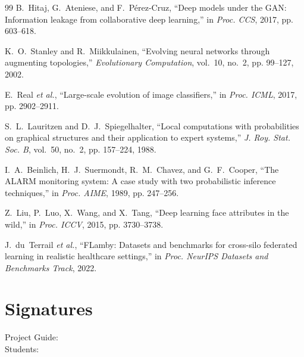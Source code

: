 \documentclass[journal]{IEEEtran}
\begin{document}
\begin{thebibliography}{99}
  B.~Hitaj, G.~Ateniese, and F.~P\'erez-Cruz,
  ``Deep models under the {GAN}: Information leakage from collaborative deep learning,''
  in \emph{Proc. CCS}, 2017, pp. 603--618.

  K.~O.~Stanley and R.~Miikkulainen,
  ``Evolving neural networks through augmenting topologies,''
  \emph{Evolutionary Computation}, vol.~10, no.~2, pp. 99--127, 2002.

  E.~Real \emph{et al.},
  ``Large-scale evolution of image classifiers,''
  in \emph{Proc. ICML}, 2017, pp. 2902--2911.

  S.~L.~Lauritzen and D.~J.~Spiegelhalter,
  ``Local computations with probabilities on graphical structures and their application to expert systems,''
  \emph{J. Roy. Stat. Soc. B}, vol.~50, no.~2, pp. 157--224, 1988.

  I.~A.~Beinlich, H.~J.~Suermondt, R.~M.~Chavez, and G.~F.~Cooper,
  ``The {ALARM} monitoring system: A case study with two probabilistic inference techniques,''
  in \emph{Proc. AIME}, 1989, pp. 247--256.

  Z.~Liu, P.~Luo, X.~Wang, and X.~Tang,
  ``Deep learning face attributes in the wild,''
  in \emph{Proc. ICCV}, 2015, pp. 3730--3738.

  J.~du~Terrail \emph{et al.},
  ``{FLamby}: Datasets and benchmarks for cross-silo federated learning in realistic healthcare settings,''
  in \emph{Proc. NeurIPS Datasets and Benchmarks Track}, 2022.

\end{thebibliography}

\newpage
\section*{Signatures}
\vspace{2cm}
\begin{center}
Project Guide: \hrulefill \\[1cm]
Students: \hrulefill
\end{center}
\end{document}
